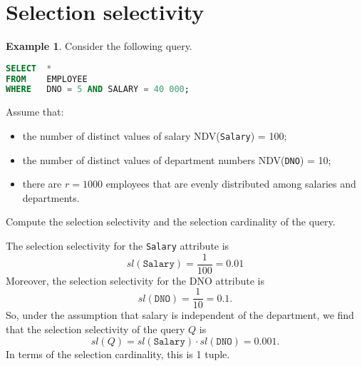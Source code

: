 \documentclass[a4paper, openany]{memoir}
\theoremstyle{definition}
\newtheorem{example}[subsection]{Example}
\begin{document}
\section{Selection selectivity}
\begin{example}
    Consider the following query.
\begin{lstlisting}[language=SQL]
SELECT  * 
FROM    EMPLOYEE
WHERE   DNO = 5 AND SALARY = 40 000;
\end{lstlisting}
    Assume that:
    \begin{itemize}
        \item the number of distinct values of salary NDV(\texttt{Salary}) = 100;
        \item the number of distinct values of department numbers NDV(\texttt{DNO}) = 10;
        \item there are $r = 1000$ employees that are evenly distributed among salaries and departments.
    \end{itemize}
    Compute the selection selectivity and the selection cardinality of the query.
\end{example}
\begin{answer}
    The selection selectivity for the \texttt{Salary} attribute is
    \[\textit{sl}(\texttt{Salary}) = \frac{1}{100} = 0.01\]
    Moreover, the selection selectivity for the DNO attribute is
    \[\textit{sl}(\texttt{DNO}) = \frac{1}{10} = 0.1.\]
    So, under the assumption that salary is independent of the department, we find that the selection selectivity of the query $Q$ is
    \[\textit{sl}(Q) = \textit{sl}(\texttt{Salary}) \cdot \textit{sl}(\texttt{DNO}) = 0.001.\]
    In terms of the selection cardinality, this is 1 tuple.
\end{answer}
\newpage
\end{document}
